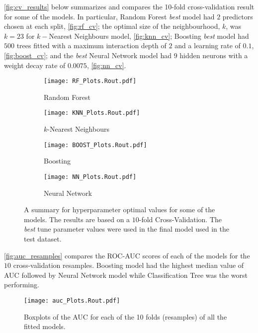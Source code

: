 \clearpage
\noindent \autoref{fig:cv_results} below summarizes and compares the 10-fold cross-validation result for some of the models. In particular, Random Forest \textit{best} model had $2$ predictors chosen at each split, \autoref{fig:rf_cv}; the optimal size of the neighbourhood, $k$, was $k = 23$ for $k-$Nearest Neighbours model, \autoref{fig:knn_cv}; Boosting \textit{best} model had $500$ trees fitted with a maximum interaction depth of $2$ and a learning rate of $0.1$, \autoref{fig:boost_cv}; and the \textit{best} Neural Network model had $9$ hidden neurons with a weight decay rate of $0.0075$, \autoref{fig:nn_cv}.
\noindent\begin{figure}[H]
    \centering
    \begin{subfigure}[b]{0.4\textwidth}
        \texttt{[image: RF\_Plots.Rout.pdf]}
        \caption{\small{Random Forest}}\label{fig:rf_cv}
    \end{subfigure}
    \begin{subfigure}[b]{0.4\textwidth}
        \texttt{[image: KNN\_Plots.Rout.pdf]}
        \caption{\small{$k$-Nearest Neighbours}}\label{fig:knn_cv}
    \end{subfigure}
    \begin{subfigure}[b]{0.4\textwidth}
        \texttt{[image: BOOST\_Plots.Rout.pdf]}
        \caption{\small{Boosting}}\label{fig:boost_cv}
    \end{subfigure}
    \begin{subfigure}[b]{0.4\textwidth}
        \texttt{[image: NN\_Plots.Rout.pdf]}
        \caption{\small{Neural Network}}\label{fig:nn_cv}
    \end{subfigure}
    \caption{{A summary for hyperparameter optimal values for some of the models. The results are based on a $10$-fold Cross-Validation. The \textit{best} tune parameter values were used in the final model used in the test dataset.}}\label{fig:cv_results}
\end{figure}

\clearpage
\noindent \autoref{fig:auc_resamples} compares the ROC-AUC scores of each of the models for the $10$ cross-validation resamples. Boosting model had the highest median value of AUC followed by Neural Network model while Classification Tree was the worst performing.
\noindent\begin{figure}[H]
    \centering
    \texttt{[image: auc\_Plots.Rout.pdf]}\vspace{-0.3cm}
    \caption{\small{Boxplots of the AUC for each of the 10 folds (resamples) of all the fitted models.}}\label{fig:auc_resamples}
\end{figure}

